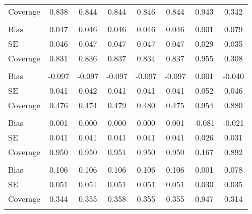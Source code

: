 \begin{appendix}
\begin{table}
\begin{tabular}{lS[table-format = 1.3]S[table-format = 1.3]S[table-format = 1.3]S[table-format = 1.3]S[table-format = 1.3]S[table-format = 1.3]S[table-format = 1.3]}
\hspace{1em}Coverage & 0.838 & 0.844 & 0.844 & 0.846 & 0.844 & 0.943 & 0.342\\
\addlinespace[0.3em]
\\
\hspace{1em}Bias & 0.047 & 0.046 & 0.046 & 0.046 & 0.046 & 0.001 & 0.079\\
\hspace{1em}SE & 0.046 & 0.047 & 0.047 & 0.047 & 0.047 & 0.029 & 0.035\\
\hspace{1em}Coverage & 0.831 & 0.836 & 0.837 & 0.834 & 0.837 & 0.955 & 0.308\\
\addlinespace[0.3em]
\\
\hspace{1em}Bias & -0.097 & -0.097 & -0.097 & -0.097 & -0.097 & 0.001 & -0.040\\
\hspace{1em}SE & 0.041 & 0.042 & 0.041 & 0.041 & 0.041 & 0.052 & 0.046\\
\hspace{1em}Coverage & 0.476 & 0.474 & 0.479 & 0.480 & 0.475 & 0.954 & 0.880\\
\addlinespace[0.3em]
\\
\hspace{1em}Bias & 0.001 & 0.000 & 0.000 & 0.000 & 0.001 & -0.081 & -0.021\\
\hspace{1em}SE & 0.041 & 0.041 & 0.041 & 0.041 & 0.041 & 0.026 & 0.031\\
\hspace{1em}Coverage & 0.950 & 0.950 & 0.951 & 0.950 & 0.950 & 0.167 & 0.892\\
\addlinespace[0.3em]
\\
\hspace{1em}Bias & 0.106 & 0.106 & 0.106 & 0.106 & 0.106 & 0.001 & 0.078\\
\hspace{1em}SE & 0.051 & 0.051 & 0.051 & 0.051 & 0.051 & 0.030 & 0.035\\
\hspace{1em}Coverage & 0.344 & 0.355 & 0.358 & 0.355 & 0.355 & 0.947 & 0.314\\
\addlinespace[0.3em]
\\

\end{tabular}
\end{table}
\end{appendix}
